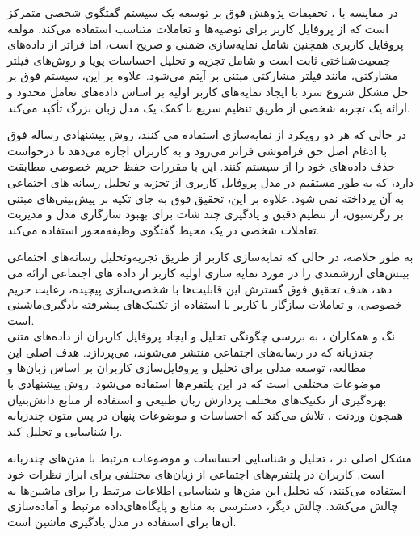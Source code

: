 در مقایسه با %
\cite{azzam2022model}
، تحقیقات پژوهش فوق بر توسعه یک سیستم گفتگوی شخصی متمرکز است که از پروفایل کاربر برای توصیه‌ها و تعاملات متناسب استفاده می‌کند. مولفه پروفایل کاربری همچنین شامل نمایه‌سازی ضمنی و صریح است، اما فراتر از داده‌های جمعیت‌شناختی ثابت است و شامل تجزیه و تحلیل احساسات پویا و روش‌های فیلتر مشارکتی، مانند فیلتر مشارکتی مبتنی بر آیتم می‌شود. علاوه بر این، سیستم فوق بر حل مشکل شروع سرد با ایجاد نمایه‌های کاربر اولیه بر اساس داده‌های تعامل محدود و ارائه یک تجربه شخصی از طریق تنظیم سریع با کمک یک مدل زبان بزرگ تأکید می‌کند.

در حالی که هر دو رویکرد از نمایه‌سازی استفاده می کنند، روش پیشنهادی رساله فوق با ادغام اصل حق فراموشی فراتر می‌رود و به کاربران اجازه می‌دهد تا درخواست حذف داده‌های خود را از سیستم کنند. این با مقررات حفظ حریم خصوصی مطابقت دارد، که به طور مستقیم در مدل پروفایل کاربری از تجزیه و تحلیل رسانه های اجتماعی به آن پرداخته نمی شود. علاوه بر این، تحقیق فوق به جای تکیه بر پیش‌بینی‌های مبتنی بر رگرسیون، از تنظیم دقیق و یادگیری چند شات برای بهبود سازگاری مدل و مدیریت تعاملات شخصی در یک محیط گفتگوی وظیفه‌محور استفاده می‌کند.

به طور خلاصه، در حالی که نمایه‌سازی کاربر از طریق تجزیه‌وتحلیل رسانه‌های اجتماعی بینش‌های ارزشمندی را در مورد نمایه سازی اولیه کاربر از داده های اجتماعی ارائه می دهد، هدف تحقیق فوق گسترش این قابلیت‌ها با شخصی‌سازی پیچیده، رعایت حریم خصوصی، و تعاملات سازگار با کاربر با استفاده از تکنیک‌های پیشرفته یادگیری‌ماشینی است.\\


نگ و همکاران %
\cite{nag2023knowledge}، 
 به بررسی چگونگی تحلیل و ایجاد پروفایل کاربران از داده‌های متنی چندزبانه که در رسانه‌های اجتماعی منتشر می‌شوند، می‌پردازد. هدف اصلی این مطالعه، توسعه مدلی برای تحلیل و پروفایل‌سازی کاربران بر اساس زبان‌ها و موضوعات مختلفی است که در این پلتفرم‌ها استفاده می‌شود. روش پیشنهادی با بهره‌گیری از تکنیک‌های مختلف پردازش زبان طبیعی و استفاده از منابع دانش‌بنیان همچون 
وردنت%
، تلاش می‌کند که احساسات و موضوعات پنهان در پس متون چندزبانه را شناسایی و تحلیل کند.

مشکل اصلی در
\cite{nag2023knowledge}
، تحلیل و شناسایی احساسات و موضوعات مرتبط با متن‌های چندزبانه است. کاربران در پلتفرم‌های اجتماعی از زبان‌های مختلفی برای ابراز نظرات خود استفاده می‌کنند، که تحلیل این متن‌ها و شناسایی اطلاعات مرتبط را برای ماشین‌ها به چالش می‌کشد. چالش دیگر، دسترسی به منابع و پایگاه‌های‌داده مرتبط و آماده‌سازی آن‌ها برای استفاده در مدل یادگیری ماشین است.


